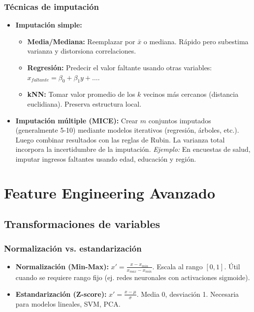 \documentclass[12pt,a4paper,openany,oneside]{book}
\begin{document}
\subsubsection{Técnicas de imputación}
\begin{itemize}
    \item \textbf{Imputación simple:}
    \begin{itemize}
        \item \textbf{Media/Mediana:} Reemplazar por $\bar{x}$ o mediana. Rápido pero subestima varianza y distorsiona correlaciones.
        \item \textbf{Regresión:} Predecir el valor faltante usando otras variables: $x_{faltante} = \beta_0 + \beta_1 y + \dots$.
        \item \textbf{kNN:} Tomar valor promedio de los $k$ vecinos más cercanos (distancia euclidiana). Preserva estructura local.
    \end{itemize}
    \item \textbf{Imputación múltiple (MICE):} Crear $m$ conjuntos imputados (generalmente 5-10) mediante modelos iterativos (regresión, árboles, etc.). Luego combinar resultados con las reglas de Rubin. La varianza total incorpora la incertidumbre de la imputación. \textit{Ejemplo:} En encuestas de salud, imputar ingresos faltantes usando edad, educación y región.
\end{itemize}

\section{Feature Engineering Avanzado}

\subsection{Transformaciones de variables}

\subsubsection{Normalización vs. estandarización}
\begin{itemize}
    \item \textbf{Normalización (Min-Max):} $x' = \frac{x - x_{min}}{x_{max} - x_{min}}$. Escala al rango $[0,1]$. Útil cuando se requiere rango fijo (ej. redes neuronales con activaciones sigmoide).
    \item \textbf{Estandarización (Z-score):} $x' = \frac{x - \mu}{\sigma}$. Media 0, desviación 1. Necesaria para modelos lineales, SVM, PCA.
\end{itemize}
\end{document}
